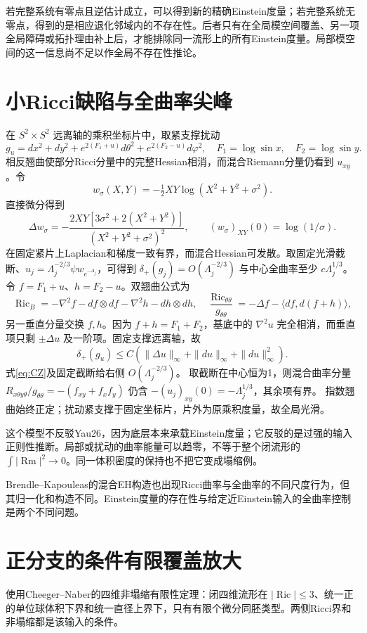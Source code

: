\documentclass[UTF8,a4paper,11pt,fontset=fandol]{ctexart}
\numberwithin{equation}{section}
\theoremstyle{definition}
\newcommand{\Ric}{\operatorname{Ric}}
\newcommand{\Rm}{\operatorname{Rm}}
\begin{document}
若完整系统有零点且逆估计成立，可以得到新的精确Einstein度量；若完整系统无零点，得到的是相应退化邻域内的不存在性。后者只有在全局模空间覆盖、另一项全局障碍或拓扑理由补上后，才能排除同一流形上的所有Einstein度量。局部模空间的这一信息尚不足以作全局不存在性推论。

\section{小Ricci缺陷与全曲率尖峰}
在 $S^2\times S^2$ 远离轴的乘积坐标片中，取紧支撑扰动
\[
g_u=dx^2+dy^2+e^{2(F_1+u)}d\theta^2+e^{2(F_2-u)}d\varphi^2,
\quad F_1=\log\sin x,\quad F_2=\log\sin y.
\]
相反翘曲使部分Ricci分量中的完整Hessian相消，而混合Riemann分量仍看到 $u_{xy}$。令
\[
w_\sigma(X,Y)=-\tfrac12XY\log(X^2+Y^2+\sigma^2).
\]
直接微分得到
\begin{equation}\label{eq:CZ}
\Delta w_\sigma=-\frac{2XY[3\sigma^2+2(X^2+Y^2)]}{(X^2+Y^2+\sigma^2)^2},
\qquad (w_\sigma)_{XY}(0)=\log(1/\sigma).
\end{equation}
在固定紧片上Laplacian和梯度一致有界，而混合Hessian可发散。取固定光滑截断、$u_j=\Lambda_j^{-2/3}\psi w_{e^{-\Lambda_j}}$，可得到 $\delta_+(g_j)=O(\Lambda_j^{-2/3})$ 与中心全曲率至少 $c\Lambda_j^{1/3}$。令 $f=F_1+u$、$h=F_2-u$。双翘曲公式为
\[
\Ric_B=-\nabla^2f-df\otimes df-\nabla^2h-dh\otimes dh,\quad
\frac{\Ric_{\theta\theta}}{g_{\theta\theta}}
=-\Delta f-\langle df,d(f+h)\rangle,
\]
另一垂直分量交换 $f,h$。因为 $f+h=F_1+F_2$，基底中的 $\nabla^2u$ 完全相消，而垂直项只剩 $\pm\Delta u$ 及一阶项。固定支撑远离轴，故
\[
\delta_+(g_u)\le C(\|\Delta u\|_\infty+\|du\|_\infty+\|du\|_\infty^2).
\]
式\eqref{eq:CZ}及固定截断给右侧 $O(\Lambda_j^{-2/3})$。
取截断在中心恒为1，则混合曲率分量
$R_{x\theta y\theta}/g_{\theta\theta}
=-(f_{xy}+f_xf_y)$ 仍含
$-(u_j)_{xy}(0)=-\Lambda_j^{1/3}$，其余项有界。
指数翘曲始终正定；扰动紧支撑于固定坐标片，片外为原乘积度量，故全局光滑。

这个模型不反驳Yau26，因为底层本来承载Einstein度量；它反驳的是过强的输入正则性推断。局部或扰动的曲率能量可以趋零，不等于整个闭流形的 $\int|\Rm|^2\to0$。同一体积密度的保持也不把它变成塌缩例。

Brendle--Kapouleas的混合EH构造也出现Ricci曲率与全曲率的不同尺度行为\cite{BK}，但其归一化和构造不同。Einstein度量的存在性与给定近Einstein输入的全曲率控制是两个不同问题。

\section{正分支的条件有限覆盖放大}\label{sec:coveramplifier}
使用Cheeger--Naber的四维非塌缩有限性定理\cite[Theorem 1.12]{CN}：闭四维流形在 $|\Ric|\le3$、统一正的单位球体积下界和统一直径上界下，只有有限个微分同胚类型。两侧Ricci界和非塌缩都是该输入的条件。
\end{document}
